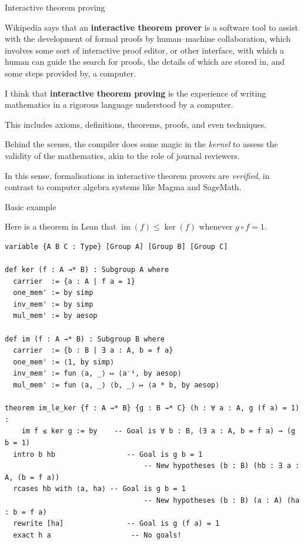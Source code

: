 \documentclass[10pt]{beamer}
\begin{document}
\begin{frame}[t]{Interactive theorem proving}

Wikipedia says that an \textbf{interactive theorem prover} is a software tool to assist with the development of formal proofs by human–machine collaboration, which involves some sort of interactive proof editor, or other interface, with which a human can guide the search for proofs, the details of which are stored in, and some steps provided by, a computer.

\pause

\vspace{0.5cm} I think that \textbf{interactive theorem proving} is the experience of writing mathematics in a rigorous language understood by a computer.

\pause

\vspace{0.5cm} This includes axioms, definitions, theorems, proofs, and even techniques.

\pause

\vspace{0.5cm} Behind the scenes, the compiler does some magic in the \emph{kernel} to assess the validity of the mathematics, akin to the role of journal reviewers.

\pause

\vspace{0.5cm} In this sense, formalisations in interactive theorem provers are \emph{verified}, in contrast to computer algebra systems like Magma and SageMath.

\end{frame}

\begin{frame}[fragile, t]{Basic example}

Here is a theorem in Lean that $ \operatorname{im}(f) \le \ker(f) $ whenever $ g \circ f = 1 $.

\begin{lstlisting}[basicstyle=\scriptsize, frame=single]
variable {A B C : Type} [Group A] [Group B] [Group C]

def ker (f : A →* B) : Subgroup A where
  carrier  := {a : A | f a = 1}
  one_mem' := by simp
  inv_mem' := by simp
  mul_mem' := by aesop

def im (f : A →* B) : Subgroup B where
  carrier  := {b : B | ∃ a : A, b = f a}
  one_mem' := ⟨1, by simp⟩
  inv_mem' := fun ⟨a, _⟩ ↦ ⟨a⁻¹, by aesop⟩
  mul_mem' := fun ⟨a, _⟩ ⟨b, _⟩ ↦ ⟨a * b, by aesop⟩

theorem im_le_ker {f : A →* B} {g : B →* C} (h : ∀ a : A, g (f a) = 1) :
    im f ≤ ker g := by    -- Goal is ∀ b : B, (∃ a : A, b = f a) → (g b = 1)
  intro b hb                 -- Goal is g b = 1
                                 -- New hypotheses (b : B) (hb : ∃ a : A, (b = f a))
  rcases hb with ⟨a, ha⟩ -- Goal is g b = 1
                                 -- New hypotheses (b : B) (a : A) (ha : b = f a)
  rewrite [ha]               -- Goal is g (f a) = 1
  exact h a                   -- No goals!
\end{lstlisting}

\end{frame}
\end{document}

